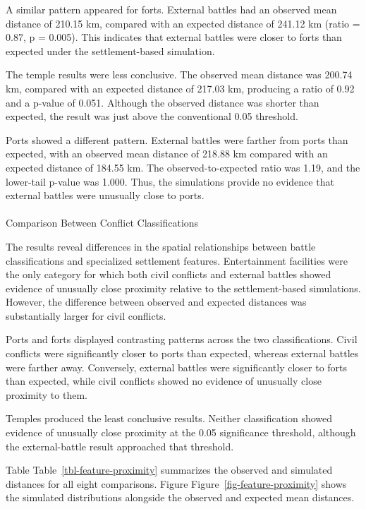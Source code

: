 \documentclass[
  letterpaper,
  DIV=11,
  numbers=noendperiod]{scrartcl}
\makeatletter
\let\oldparagraph\paragraph
\renewcommand{\paragraph}{
    \@ifstar
      \xxxParagraphStar
      \xxxParagraphNoStar
  }
\newcommand{\xxxParagraphStar}[1]{\oldparagraph*{#1}\mbox{}}
\newcommand{\xxxParagraphNoStar}[1]{\oldparagraph{#1}\mbox{}}
\makeatother
\begin{document}
A similar pattern appeared for forts. External battles had an observed
mean distance of 210.15 km, compared with an expected distance of 241.12
km (ratio = 0.87, p = 0.005). This indicates that external battles were
closer to forts than expected under the settlement-based simulation.

The temple results were less conclusive. The observed mean distance was
200.74 km, compared with an expected distance of 217.03 km, producing a
ratio of 0.92 and a p-value of 0.051. Although the observed distance was
shorter than expected, the result was just above the conventional 0.05
threshold.

Ports showed a different pattern. External battles were farther from
ports than expected, with an observed mean distance of 218.88 km
compared with an expected distance of 184.55 km. The
observed-to-expected ratio was 1.19, and the lower-tail p-value was
1.000. Thus, the simulations provide no evidence that external battles
were unusually close to ports.

\paragraph{Comparison Between Conflict
Classifications}\label{comparison-between-conflict-classifications}

The results reveal differences in the spatial relationships between
battle classifications and specialized settlement features.
Entertainment facilities were the only category for which both civil
conflicts and external battles showed evidence of unusually close
proximity relative to the settlement-based simulations. However, the
difference between observed and expected distances was substantially
larger for civil conflicts.

Ports and forts displayed contrasting patterns across the two
classifications. Civil conflicts were significantly closer to ports than
expected, whereas external battles were farther away. Conversely,
external battles were significantly closer to forts than expected, while
civil conflicts showed no evidence of unusually close proximity to them.

Temples produced the least conclusive results. Neither classification
showed evidence of unusually close proximity at the 0.05 significance
threshold, although the external-battle result approached that
threshold.

Table Table~\ref{tbl-feature-proximity} summarizes the observed and
simulated distances for all eight comparisons. Figure
Figure~\ref{fig-feature-proximity} shows the simulated distributions
alongside the observed and expected mean distances.
\end{document}
